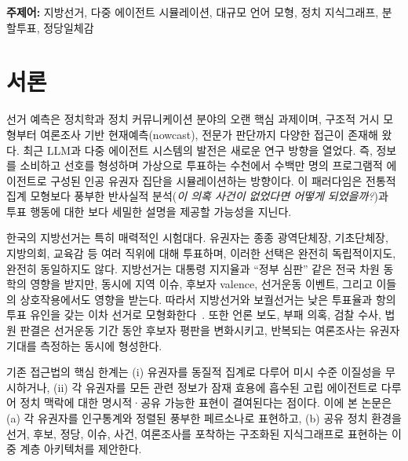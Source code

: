 \documentclass[11pt]{article}
\begin{document}
\vspace{0.5em}
\noindent\textbf{주제어:} 지방선거, 다중 에이전트 시뮬레이션, 대규모 언어 모형, 정치 지식그래프, 분할투표, 정당일체감

\section{서론}

선거 예측은 정치학과 정치 커뮤니케이션 분야의 오랜 핵심 과제이며, 구조적 거시 모형부터 여론조사 기반 현재예측(nowcast), 전문가 판단까지 다양한 접근이 존재해 왔다. 최근 LLM과 다중 에이전트 시스템의 발전은 새로운 연구 방향을 열었다. 즉, 정보를 소비하고 선호를 형성하며 가상으로 투표하는 수천에서 수백만 명의 프로그램적 에이전트로 구성된 인공 유권자 집단을 시뮬레이션하는 방향이다. 이 패러다임은 전통적 집계 모형보다 풍부한 반사실적 분석(\emph{이 의혹 사건이 없었다면 어떻게 되었을까?})과 투표 행동에 대한 보다 세밀한 설명을 제공할 가능성을 지닌다.

한국의 지방선거는 특히 매력적인 시험대다. 유권자는 종종 광역단체장, 기초단체장, 지방의회, 교육감 등 여러 직위에 대해 투표하며, 이러한 선택은 완전히 독립적이지도, 완전히 동일하지도 않다. 지방선거는 대통령 지지율과 ``정부 심판'' 같은 전국 차원 동학의 영향을 받지만, 동시에 지역 이슈, 후보자 valence, 선거운동 이벤트, 그리고 이들의 상호작용에서도 영향을 받는다. 따라서 지방선거와 보궐선거는 낮은 투표율과 항의 투표 유인을 갖는 이차 선거로 모형화한다~\cite{reif1980secondorder}. 또한 언론 보도, 부패 의혹, 검찰 수사, 법원 판결은 선거운동 기간 동안 후보자 평판을 변화시키고, 반복되는 여론조사는 유권자 기대를 측정하는 동시에 형성한다.

기존 접근법의 핵심 한계는 (i) 유권자를 동질적 집계로 다루어 미시 수준 이질성을 무시하거나, (ii) 각 유권자를 모든 관련 정보가 잠재 효용에 흡수된 고립 에이전트로 다루어 정치 맥락에 대한 명시적·공유 가능한 표현이 결여된다는 점이다. 이에 본 논문은 (a) 각 유권자를 인구통계와 정렬된 풍부한 페르소나로 표현하고, (b) 공유 정치 환경을 선거, 후보, 정당, 이슈, 사건, 여론조사를 포착하는 구조화된 지식그래프로 표현하는 이중 계층 아키텍처를 제안한다.
\end{document}
